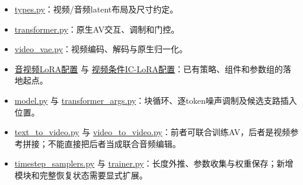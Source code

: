 \begin{itemize}
\tightlist
\item
  \href{https://github.com/Lightricks/LTX-2/blob/bd92a5f408eb8c99f8c05e9fe2fcaaec8b56b638/packages/ltx-core/src/ltx_core/types.py}{types.py}：视频/音频latent布局及尺寸约定。
\item
  \href{https://github.com/Lightricks/LTX-2/blob/bd92a5f408eb8c99f8c05e9fe2fcaaec8b56b638/packages/ltx-core/src/ltx_core/model/transformer/transformer.py}{transformer.py}：原生AV交互、调制和门控。
\item
  \href{https://github.com/Lightricks/LTX-2/blob/bd92a5f408eb8c99f8c05e9fe2fcaaec8b56b638/packages/ltx-core/src/ltx_core/model/video_vae/video_vae.py}{video\_vae.py}：视频编码、解码与原生归一化。
\item
  \href{https://github.com/Lightricks/LTX-2/blob/bd92a5f408eb8c99f8c05e9fe2fcaaec8b56b638/packages/ltx-trainer/configs/ltx2_av_lora.yaml}{音视频LoRA配置} 与 \href{https://github.com/Lightricks/LTX-2/blob/bd92a5f408eb8c99f8c05e9fe2fcaaec8b56b638/packages/ltx-trainer/configs/ltx2_v2v_ic_lora.yaml}{视频条件IC-LoRA配置}：已有策略、组件和参数组的落地起点。
\item
  \href{https://github.com/Lightricks/LTX-2/blob/bd92a5f408eb8c99f8c05e9fe2fcaaec8b56b638/packages/ltx-core/src/ltx_core/model/transformer/model.py}{model.py} 与 \href{https://github.com/Lightricks/LTX-2/blob/bd92a5f408eb8c99f8c05e9fe2fcaaec8b56b638/packages/ltx-core/src/ltx_core/model/transformer/transformer_args.py}{transformer\_args.py}：块循环、逐token噪声调制及候选支路插入位置。
\item
  \href{https://github.com/Lightricks/LTX-2/blob/bd92a5f408eb8c99f8c05e9fe2fcaaec8b56b638/packages/ltx-trainer/src/ltx_trainer/training_strategies/text_to_video.py}{text\_to\_video.py} 与 \href{https://github.com/Lightricks/LTX-2/blob/bd92a5f408eb8c99f8c05e9fe2fcaaec8b56b638/packages/ltx-trainer/src/ltx_trainer/training_strategies/video_to_video.py}{video\_to\_video.py}：前者可联合训练AV，后者是视频参考拼接；不能直接把后者当成联合音频编辑。
\item
  \href{https://github.com/Lightricks/LTX-2/blob/bd92a5f408eb8c99f8c05e9fe2fcaaec8b56b638/packages/ltx-trainer/src/ltx_trainer/timestep_samplers.py}{timestep\_samplers.py} 与 \href{https://github.com/Lightricks/LTX-2/blob/bd92a5f408eb8c99f8c05e9fe2fcaaec8b56b638/packages/ltx-trainer/src/ltx_trainer/trainer.py}{trainer.py}：长度外推、参数收集与权重保存；新增模块和完整恢复状态需要显式扩展。
\end{itemize}

